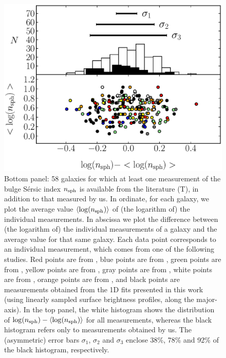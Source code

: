 \documentclass[preprint2]{emulateapj}
\begin{document}
\begin{figure}%
\begin{center}
\includegraphics[width=1.1\columnwidth]{images/comparison_all_n.eps} 
\caption{Bottom panel: 58 galaxies for which at least one measurement of the bulge S\'ersic index $n_{\rm sph}$ is available 
from the literature (T), in addition to that measured by us.
In ordinate, for each galaxy, we plot the average value $\langle \log(n_{\rm sph}) \rangle$ of (the logarithm of) the individual measurements. 
In abscissa we plot the difference between (the logarithm of) the individual measurements of a galaxy 
and the average value for that same galaxy.
Each data point corresponds to an individual measurement, 
which comes from one of the following studies. 
Red points are from \cite{grahamdriver2007}, 
blue points are from \cite{laurikainen2010}, green points are from \cite{sani2011}, 
yellow points are from \cite{vika2012}, gray points are from \cite{beifiori2012},
white points are from \cite{rusli2013}, orange points are from \cite{lasker2014data},
and black points are measurements obtained from the 1D fits presented in this work 
(using linearly sampled surface brightness profiles, along the major-axis).
In the top panel, the white histogram shows the distribution of $\log(n_{\rm sph}) - \langle \log(n_{\rm sph}) \rangle$ 
for all measurements, 
whereas the black histogram refers only to measurements obtained by us.
The (asymmetric) error bars $\sigma_1$, $\sigma_2$ and $\sigma_3$ enclose 38\%, 78\% and 92\% 
of the black histogram, respectively.}
\label{fig:compn}
\end{center}
\end{figure}
\end{document}
